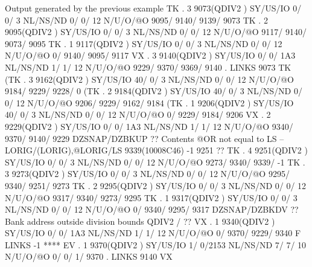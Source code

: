 \begin{landscapebody}
\begin{XMPt}{Output generated by the previous example}
 TK  .     3     9073(QDIV2   ) SY/US/IO    0/    0/   3 NL/NS/ND    0/    0/      12 N/U/O/@O    9095/    9140/    9139/    9073
 TK  .     2     9095(QDIV2   ) SY/US/IO    0/    0/   3 NL/NS/ND    0/    0/      12 N/U/O/@O    9117/    9140/    9073/    9095
 TK  .     1     9117(QDIV2   ) SY/US/IO    0/    0/   3 NL/NS/ND    0/    0/      12 N/U/O/@O       0/    9140/    9095/    9117
 VX  .     3     9140(QDIV2   ) SY/US/IO    0/    0/ 1A3 NL/NS/ND    1/    1/      12 N/U/O/@O    9229/    9370/    9369/    9140
     . LINKS      9073 TK                                                                                                        
(TK  .     3     9162(QDIV2   ) SY/US/IO   40/    0/   3 NL/NS/ND    0/    0/      12 N/U/O/@O    9184/    9229/    9228/       0
(TK  .     2     9184(QDIV2   ) SY/US/IO   40/    0/   3 NL/NS/ND    0/    0/      12 N/U/O/@O    9206/    9229/    9162/    9184
(TK  .     1     9206(QDIV2   ) SY/US/IO   40/    0/   3 NL/NS/ND    0/    0/      12 N/U/O/@O       0/    9229/    9184/    9206
 VX  .     2     9229(QDIV2   ) SY/US/IO    0/    0/ 1A3 NL/NS/ND    1/    1/      12 N/U/O/@O    9340/    9370/    9140/    9229
 DZSNAP/DZBKUP ?? Contents @OR not equal to LS -- LORIG/(LORIG),@LORIG/LS                 9339(10008C46)      -1    9251       ?? 
 TK  .     4     9251(QDIV2   ) SY/US/IO    0/    0/   3 NL/NS/ND    0/    0/      12 N/U/O/@O    9273/    9340/    9339/      -1
 TK  .     3     9273(QDIV2   ) SY/US/IO    0/    0/   3 NL/NS/ND    0/    0/      12 N/U/O/@O    9295/    9340/    9251/    9273
 TK  .     2     9295(QDIV2   ) SY/US/IO    0/    0/   3 NL/NS/ND    0/    0/      12 N/U/O/@O    9317/    9340/    9273/    9295
 TK  .     1     9317(QDIV2   ) SY/US/IO    0/    0/   3 NL/NS/ND    0/    0/      12 N/U/O/@O       0/    9340/    9295/    9317
 DZSNAP/DZBKDV ?? Bank address outside division bounds                                QDIV2   /                                ?? 
 VX  .     1     9340(QDIV2   ) SY/US/IO    0/    0/ 1A3 NL/NS/ND    1/    1/      12 N/U/O/@O       0/    9370/    9229/    9340
     F LINKS        -1 ****                                                                                                      
 EV  .     1     9370(QDIV2   ) SY/US/IO    1/    0/2153 NL/NS/ND    7/    7/      10 N/U/O/@O       0/       0/       1/    9370
     . LINKS      9140 VX                                                                                                        
\end{XMPt}
\end{landscapebody}
